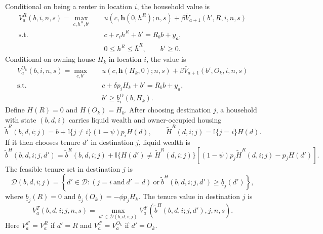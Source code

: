 \documentclass[11pt]{article}
\newcommand{\ind}{\mathbb{I}}
\newcommand{\Dset}{\mathcal D}
\begin{document}
Conditional on being a renter in location $i$, the household value is
\begin{equation}
\begin{aligned}
V^R_a(b,i,n,s)
=
\max_{c,h^R,b'}\quad
&u(c,\mathbf h(0,h^R);n,s)
+\beta \bar V_{a+1}(b',R,i,n,s)\\
\text{s.t.}\quad
&c+r_i h^R+b'=R_b b+y_a,\\
&0\leq h^R\leq \bar h^R,\qquad b'\geq 0.
\end{aligned}
\label{eq:renter_problem}
\end{equation}
Conditional on owning house $H_k$ in location $i$, the value is
\begin{equation}
\begin{aligned}
V^{O_k}_a(b,i,n,s)
=
\max_{c,b'}\quad
&u(c,\mathbf h(H_k,0);n,s)
+\beta \bar V_{a+1}(b',O_k,i,n,s)\\
\text{s.t.}\quad
&c+\delta p_iH_k+b'=R_b b+y_a,\\
&b'\geq \underline b_i^O(b,H_k).
\end{aligned}
\label{eq:owner_problem}
\end{equation}
Define $H(R)=0$ and $H(O_k)=H_k$. After choosing destination $j$, a household with state $(b,d,i)$ carries liquid wealth and owner-occupied housing
\begin{equation*}
    \widetilde b^R(b,d,i;j)
    =
    b+\ind\{j\neq i\}(1-\psi)p_iH(d),
    \qquad
    \widetilde H^R(d,i;j)
    =
    \ind\{j=i\}H(d).
\end{equation*}
If it then chooses tenure $d'$ in destination $j$, liquid wealth is
\begin{equation}
    \widetilde b^H(b,d,i;j,d')
    =
    \widetilde b^R(b,d,i;j)
    +
    \ind\{H(d')\neq \widetilde H^R(d,i;j)\}
    \left[(1-\psi)p_j\widetilde H^R(d,i;j)-p_jH(d')\right].
    \label{eq:housing_adjustment}
\end{equation}
The feasible tenure set in destination $j$ is
\begin{equation*}
\Dset(b,d,i;j)
=
\left\{
d'\in\Dset:
\left(j=i\ \text{and}\ d'=d\right)
\ \text{or}\
\widetilde b^H(b,d,i;j,d')
\geq
\underline b_j(d')
\right\},
\end{equation*}
where $\underline b_j(R)=0$ and $\underline b_j(O_k)=-\phi p_jH_k$.
The tenure value in destination $j$ is
\begin{equation}
    V^T_a(b,d,i;j,n,s)
    =
    \max_{d'\in\Dset(b,d,i;j)}
    V^{d'}_a\left(\widetilde b^H(b,d,i;j,d'),j,n,s\right).
    \label{eq:tenure_value}
\end{equation}
Here $V^{d'}_a=V^R_a$ if $d'=R$ and $V^{d'}_a=V^{O_k}_a$ if $d'=O_k$.
\end{document}
